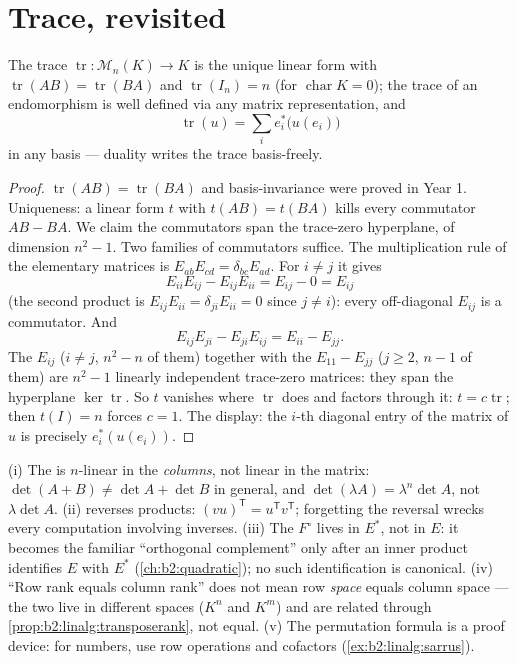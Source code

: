 \section{Trace, revisited}

\begin{proposition}\label{prop:b2:linalg:trace}
The trace $\operatorname{tr} \colon \mathcal{M}_n(K) \to K$ is the
unique linear form with $\operatorname{tr}(AB) =
\operatorname{tr}(BA)$ and $\operatorname{tr}(I_n) = n$ (for
$\operatorname{char} K = 0$); the trace of an endomorphism is
well defined via any matrix representation, and
\[
\operatorname{tr}(u) = \sum_{i} e_i^*\bigl(u(e_i)\bigr)
\]
in any basis --- duality writes the trace basis-freely.
\end{proposition}

\begin{proof}
$\operatorname{tr}(AB) = \operatorname{tr}(BA)$ and basis-invariance
were proved in Year 1. Uniqueness: a linear form $t$ with $t(AB) =
t(BA)$ kills every commutator $AB - BA$. We claim the commutators
span the trace-zero hyperplane, of dimension $n^2 - 1$. Two
families of commutators suffice. The multiplication rule of the
elementary matrices is $E_{ab}E_{cd} = \delta_{bc}E_{ad}$. For
$i \neq j$ it gives
\[
E_{ii}E_{ij} - E_{ij}E_{ii} = E_{ij} - 0 = E_{ij}
\]
(the second product is $E_{ij}E_{ii} = \delta_{ji}E_{ii} = 0$
since $j \neq i$): every off-diagonal $E_{ij}$ is a commutator.
And
\[
E_{ij}E_{ji} - E_{ji}E_{ij} = E_{ii} - E_{jj} .
\]
The $E_{ij}$ ($i \neq j$, $n^2 - n$ of them) together with the
$E_{11} - E_{jj}$ ($j \geq 2$, $n - 1$ of them) are $n^2 - 1$
linearly independent trace-zero matrices: they span the
hyperplane $\ker\operatorname{tr}$. So $t$ vanishes where
$\operatorname{tr}$ does and factors through it: $t =
c\operatorname{tr}$; then $t(I) = n$ forces $c = 1$. The display:
the $i$-th diagonal entry of the matrix of $u$ is precisely
$e_i^*(u(e_i))$.
\end{proof}

\begin{remark}\label{rem:b2:linalg:pitfalls}
(i) The  is $n$-linear in the \emph{columns}, not
linear in the matrix: $\det(A + B) \neq \det A + \det B$ in
general, and $\det(\lambda A) = \lambda^n\det A$, not
$\lambda\det A$. (ii)  reverses products:
$(vu)^{\mathsf T} = u^{\mathsf T}v^{\mathsf T}$; forgetting the
reversal wrecks every computation involving inverses. (iii) The
 $F^\circ$ lives in $E^*$, not in $E$: it becomes the
familiar ``orthogonal complement'' only after an inner product
identifies $E$ with $E^*$ (\cref{ch:b2:quadratic}); no such
identification is canonical. (iv) ``Row rank equals column
rank'' does not mean row \emph{space} equals column space ---
the two live in different spaces ($K^n$ and $K^m$) and are
related through \cref{prop:b2:linalg:transposerank}, not equal.
(v) The permutation formula is a proof device: for numbers, use
row operations and cofactors (\cref{ex:b2:linalg:sarrus}).
\end{remark}


